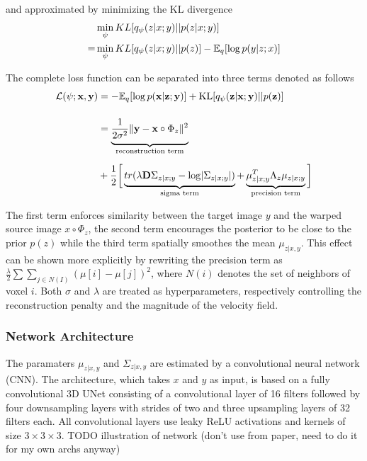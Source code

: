 and approximated by minimizing the KL divergence
\begin{equation}
	\begin{split}
		  &\min_\psi KL [ q_\psi(z | x; y) || p(z | x; y) ] \\
		= &\min_\psi KL [ q_\psi(z | x; y) || p(z) ] - \mathbb{E}_q [ \log p(y | z; x) ]
	\end{split}
\end{equation}

The complete loss function can be separated into three terms denoted as follows
\begin{equation} \label{eq:voxloss}
	\begin{split}
		\mathcal{L}(\psi; \mathbf{x}, \mathbf{y})
		& = -\E_{q}[ \log p( \mathbf{x} | \mathbf{z}; \mathbf{y} ) ]
		+ \text{KL} [ q_{\psi} ( \mathbf{z} | \mathbf{x} ; \mathbf{y} ) || p ( \mathbf{z} ) ] \\[12pt]
		& = \underbrace{
			\frac{1}{2 \sigma^2} \norm{\mathbf{y} - \mathbf{x} \circ \Phi_{z}}^{2} \vphantom{\frac{1}{2_{2_2}}}
		}_{\text{reconstruction term}} \\[6pt]
		& + \frac{1}{2} \bigg[
		\underbrace{
			tr( \lambda \mathbf{D} \Sigma_{z | x; y} - \log \abs{ \Sigma_{z | x; y} } ) \vphantom{\mu_{z | x; y}^{T}}
		}_{\text{sigma term}} +
		\underbrace{
			\mu_{z | x; y}^{T} \Lambda_{z} \mu_{z | x; y}
		}_{\text{precision term}} \bigg]
	\end{split}
\end{equation}

The first term enforces similarity between the target image $y$ and the warped source image $x \circ \Phi_z$, the second term encourages the posterior to be close to the prior $p(z)$ while the third term spatially smoothes the mean $\mu_{z | x, y}$. This effect can be shown more explicitly by rewriting the precision term as $ { \frac{\lambda}{2} \sum \sum_{j \in N(I)} ( \mu[i] - \mu[j])^{2} } $, where $N(i)$ denotes the set of neighbors of voxel $i$. Both $\sigma$ and $\lambda$ are treated as hyperparameters, respectively controlling the reconstruction penalty and the magnitude of the velocity field.

\subsubsection*{Network Architecture} %
The paramaters $\mu_{z | x, y}$ and $\Sigma_{z | x, y}$ are estimated by a convolutional neural network (CNN). The architecture, which takes $x$ and $y$ as input, is based on a fully convolutional 3D UNet consisting of a convolutional layer of 16 filters followed by four downsampling layers with strides of two and three upsampling layers of 32 filters each. All convolutional layers use leaky ReLU activations and kernels of size $3\times3\times3$. TODO illustration of network (don't use from paper, need to do it for my own archs anyway)

